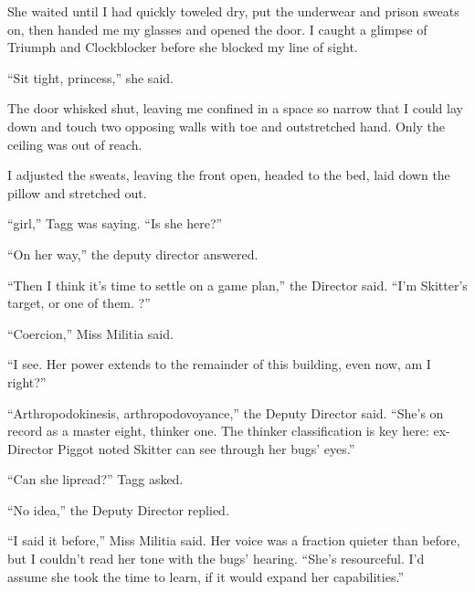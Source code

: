 She waited until I had quickly toweled dry, put the underwear and prison sweats on, then handed me my glasses and opened the door.  I caught a glimpse of Triumph and Clockblocker before she blocked my line of sight.



``Sit tight, princess,'' she said.



The door whisked shut, leaving me confined in a space so narrow that I could lay down and touch two opposing walls with toe and outstretched hand.  Only the ceiling was out of reach.



I adjusted the sweats, leaving the front open, headed to the bed, laid down the pillow and stretched out.



``\ldotsAlcott girl,'' Tagg was saying.  ``Is she here?''



``On her way,'' the deputy director answered.



``Then I think it's time to settle on a game plan,'' the Director said.  ``I'm Skitter's target, or one of them.  \ldotsssination?''



``Coercion,'' Miss Militia said.



``I see.  Her power extends to the remainder of this building, even now, am I right?''



``Arthropodokinesis, arthropodovoyance,'' the Deputy Director said.  ``She's on record as a master eight, thinker one.  The thinker classification is key here: ex-Director Piggot noted Skitter can see through her bugs' eyes.''



``Can she lipread?'' Tagg asked.



``No idea,'' the Deputy Director replied.



``I said it before,'' Miss Militia said.  Her voice was a fraction quieter than before, but I couldn't read her tone with the bugs' hearing.  ``She's resourceful.  I'd assume she took the time to learn, if it would expand her capabilities.''



